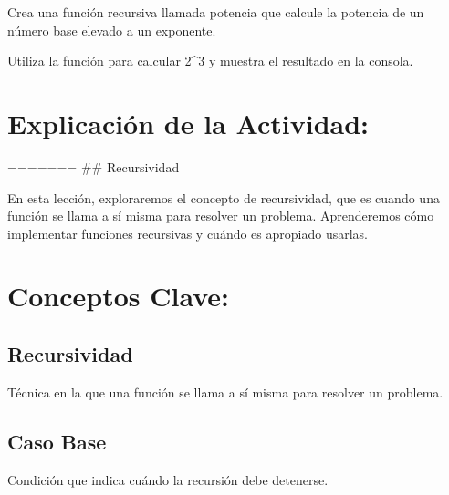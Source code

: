 \documentclass[
  a4paper,
  onepage,
  openany]{scrreprt}
\begin{document}
\begin{tcolorbox}[enhanced jigsaw, breakable, opacityback=0, toptitle=1mm, coltitle=black, toprule=.15mm, rightrule=.15mm, colframe=quarto-callout-important-color-frame, opacitybacktitle=0.6, arc=.35mm, title=\textcolor{quarto-callout-important-color}{\faExclamation}\hspace{0.5em}{Actividad Práctica:}, titlerule=0mm, colbacktitle=quarto-callout-important-color!10!white, bottomtitle=1mm, bottomrule=.15mm, colback=white, left=2mm, leftrule=.75mm]

Crea una función recursiva llamada potencia que calcule la potencia de
un número base elevado a un exponente.

Utiliza la función para calcular 2\^{}3 y muestra el resultado en la
consola.

\end{tcolorbox}

\hypertarget{explicaciuxf3n-de-la-actividad-44}{%
\section{Explicación de la
Actividad:}\label{explicaciuxf3n-de-la-actividad-44}}

======= \#\# Recursividad

En esta lección, exploraremos el concepto de recursividad, que es cuando
una función se llama a sí misma para resolver un problema. Aprenderemos
cómo implementar funciones recursivas y cuándo es apropiado usarlas.

\hypertarget{conceptos-clave-47}{%
\section{Conceptos Clave:}\label{conceptos-clave-47}}

\hypertarget{recursividad-2}{%
\subsection{Recursividad}\label{recursividad-2}}

Técnica en la que una función se llama a sí misma para resolver un
problema.

\hypertarget{caso-base-1}{%
\subsection{Caso Base}\label{caso-base-1}}

Condición que indica cuándo la recursión debe detenerse.
\end{document}
